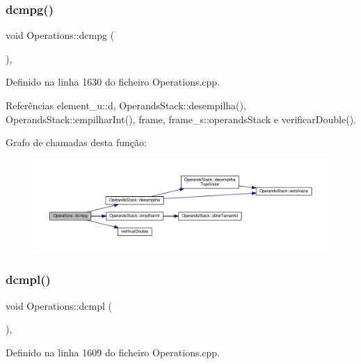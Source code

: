 \subsubsection{\texorpdfstring{dcmpg()}{dcmpg()}}
{\footnotesize\ttfamily void Operations\+::dcmpg (\begin{DoxyParamCaption}{ }\end{DoxyParamCaption})\hspace{0.3cm}{\ttfamily [static]}, {\ttfamily [private]}}



Definido na linha 1630 do ficheiro Operations.\+cpp.



Referências element\+\_\+u\+::d, Operands\+Stack\+::desempilha(), Operands\+Stack\+::empilhar\+Int(), frame, frame\+\_\+s\+::operands\+Stack e verificar\+Double().

Grafo de chamadas desta função\+:\nopagebreak
\begin{figure}[H]
\begin{center}
\leavevmode
\includegraphics[width=350pt]{classOperations_a7c2a5194de7a2a59ada752001b8ece0a_cgraph}
\end{center}
\end{figure}
\mbox{\label{classOperations_a89e1792d8c650c2274352c534cfbd7c0}} 
\subsubsection{\texorpdfstring{dcmpl()}{dcmpl()}}
{\footnotesize\ttfamily void Operations\+::dcmpl (\begin{DoxyParamCaption}{ }\end{DoxyParamCaption})\hspace{0.3cm}{\ttfamily [static]}, {\ttfamily [private]}}



Definido na linha 1609 do ficheiro Operations.\+cpp.




